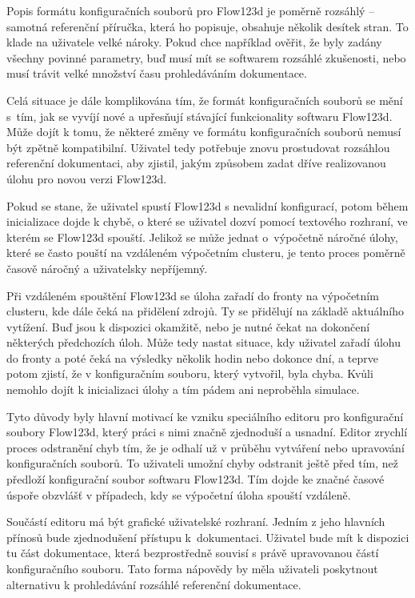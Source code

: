\documentclass[FM,bw,DP]{tulthesis}
\begin{document}
Popis formátu konfiguračních souborů pro Flow123d je poměrně rozsáhlý -- samotná referenční příručka, která ho popisuje, obsahuje několik desítek stran. To klade na uživatele velké nároky. Pokud chce například ověřit, že byly zadány všechny povinné parametry, buď musí mít se softwarem rozsáhlé zkušenosti, nebo musí trávit velké množství času prohledáváním dokumentace. 

Celá situace je dále komplikována tím, že formát konfiguračních souborů se mění s~tím, jak se vyvíjí nové a upřesňují stávající funkcionality softwaru Flow123d. Může dojít k tomu, že některé změny ve formátu konfiguračních souborů nemusí být zpětně kompatibilní. Uživatel tedy potřebuje znovu prostudovat rozsáhlou referenční dokumentaci, aby zjistil, jakým způsobem zadat dříve realizovanou úlohu pro novou verzi Flow123d.

Pokud se stane, že uživatel spustí Flow123d s nevalidní konfigurací, potom během inicializace dojde k chybě, o které se uživatel dozví pomocí textového rozhraní, ve kterém se Flow123d spouští. Jelikož se může jednat o~výpočetně náročné úlohy, které se často pouští na vzdáleném výpočetním clusteru, je tento proces poměrně časově náročný a uživatelsky nepříjemný.

Při vzdáleném spouštění Flow123d se úloha zařadí do fronty na výpočetním clusteru, kde dále čeká na přidělení zdrojů. Ty se přidělují na základě aktuálního vytížení. Buď jsou k dispozici okamžitě, nebo je nutné čekat na dokončení některých předchozích úloh. Může tedy nastat situace, kdy uživatel zařadí úlohu do fronty a poté čeká na výsledky několik hodin nebo dokonce dní, a teprve potom zjistí, že v konfiguračním souboru, který vytvořil, byla chyba. Kvůli nemohlo dojít k inicializaci úlohy a tím pádem ani neproběhla simulace.

Tyto důvody byly hlavní motivací ke vzniku speciálního editoru pro konfigurační soubory Flow123d, který práci s nimi značně zjednoduší a usnadní. Editor zrychlí proces odstranění chyb tím, že je odhalí už v průběhu vytváření nebo upravování konfiguračních souborů. To uživateli umožní chyby odstranit ještě před tím, než předloží konfigurační soubor softwaru Flow123d. Tím dojde ke značné časové úspoře obzvlášť v případech, kdy se výpočetní úloha spouští vzdáleně.

Součástí editoru má být grafické uživatelské rozhraní. Jedním z jeho hlavních přínosů bude zjednodušení přístupu k~dokumentaci. Uživatel bude mít k dispozici tu část dokumentace, která bezprostředně souvisí s právě upravovanou částí konfiguračního souboru. Tato forma nápovědy by měla uživateli poskytnout alternativu k prohledávání rozsáhlé referenční dokumentace.
\end{document}
